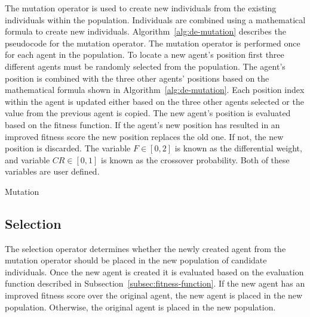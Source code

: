 The mutation operator is used to create new individuals from the existing individuals within the population. Individuals are combined using a mathematical formula to create new individuals. Algorithm~\ref{alg:de-mutation} describes the pseudocode for the mutation operator. The mutation operator is performed once for each agent in the population. To locate a new agent's position first three different agents must be randomly selected from the population. The agent's position is combined with the three other agents' positions based on the mathematical formula shown in Algorithm~\ref{alg:de-mutation}. Each position index within the agent is updated either based on the three other agents selected or the value from the previous agent is copied. The new agent's position is evaluated based on the fitness function. If the agent's new position has resulted in an improved fitness score the new position replaces the old one. If not, the new position is discarded. The variable $F \in [0,2]$ is known as the differential weight, and variable $CR \in [0,1]$ is known as the crossover probability. Both of these variables are user defined.

\begin{algorithm}
	\caption{Mutation}
	\label{alg:de-mutation}
	\begin{algorithmic}

				\ELSE
				\ENDIF
			\ENDFOR
			\ENDIF
		\ENDFOR

	\end{algorithmic}
\end{algorithm}

\subsection{Selection}
\label{subsec:de-selection}

The selection operator determines whether the newly created agent from the mutation operator should be placed in the new population of candidate individuals. Once the new agent is created it is evaluated based on the evaluation function described in Subsection~\ref{subsec:fitness-function}. If the new agent has an improved fitness score over the original agent, the new agent is placed in the new population. Otherwise, the original agent is placed in the new population.
